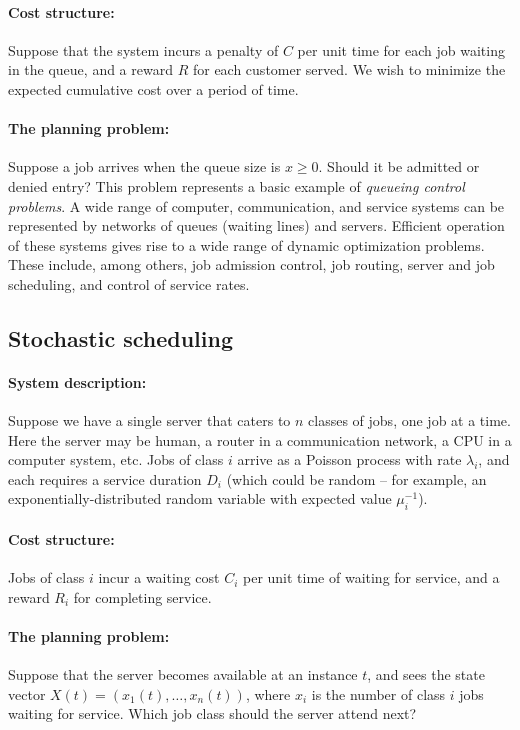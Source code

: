 \paragraph{Cost structure:} Suppose that the system incurs a penalty of $C$ per unit time for each job waiting in the queue, and a reward $R$ for each customer served. We wish to minimize the expected cumulative cost over a period of time.

\paragraph{The planning problem:} Suppose a job arrives when the queue size is $x\geq0$. Should it be admitted or denied entry?
This problem represents a basic example of \emph{queueing control problems}. A wide range of computer, communication, and service systems can be represented by networks of queues (waiting lines) and servers. Efficient operation of these systems gives rise to a wide range of dynamic optimization problems. These include, among others, job admission control, job routing, server and job scheduling, and control of service rates.

\subsection{Stochastic scheduling}
\paragraph{System description: } Suppose we have a single server that caters to $n$ classes of jobs, one job at a time. Here the server may be human, a router in a communication network, a CPU in a computer system, etc. Jobs of class $i$ arrive as a Poisson process with rate $\lambda_i$, and each requires a service duration $D_i$ (which could be random -- for example, an exponentially-distributed random variable with expected value $\mu _i^{ - 1}$).

\paragraph{Cost structure:} Jobs of class $i$ incur a waiting cost  $C_i$ per unit time of waiting for service, and a reward $R_i$ for completing service.

\paragraph{The planning problem:} Suppose that the server becomes available at an instance $t$, and sees the state vector $X(t) = ({x_1}(t), \ldots ,{x_n}(t))$, where $x_i$ is the number of class $i$ jobs waiting for service. Which job class should the server attend next?

